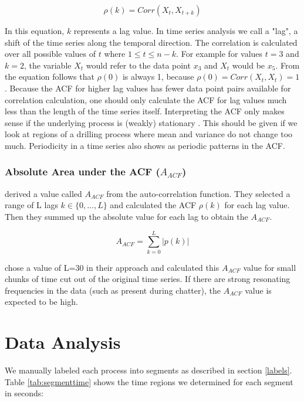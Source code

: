 \documentclass[12 pt]{scrartcl}
\begin{document}
\[ \rho(k) = Corr(X_t, X_{t+k}) \]

In this equation, $k$ represents a lag value. In time series analysis we call a "lag", a shift of the time series along the temporal direction. The correlation is calculated over all possible values of $t$ where $1 \le t \le n - k$. For example for values $t = 3$ and $k = 2$, the variable $X_t$ would refer to the data point $x_3$ and $X_t$ would be $x_5$. From the equation follows that $\rho(0)$ is always 1, because $\rho(0) = Corr(X_t, X_t) = 1$. Because the ACF for higher lag values has fewer data point pairs available for correlation calculation, one should only calculate the ACF for lag values much less than the length of the time series itself.
Interpreting the ACF only makes sense if the underlying process is (weakly) stationary \citep[p.~4]{deistler2022time}. This should be given if we look at regions of a drilling process where mean and variance do not change too much. Periodicity in a time series also shows as periodic patterns in the ACF.

\subsubsection{Absolute Area under the ACF ($A_{ACF}$)}

\citet{weinert2001statistics} derived a value called $A_{ACF}$ from the auto-correlation function. They selected a range of L lags $k \in \{0, ..., L\}$ and calculated the ACF $\rho(k)$ for each lag value. Then they summed up the absolute value for each lag to obtain the $A_{ACF}$.

\[ A_{ACF} = \sum^{L}_{k=0}{|p(k)|} \]

\citet{weinert2001statistics} chose a value of L=30 in their approach and calculated this $A_{ACF}$ value for small chunks of time cut out of the original time series. If there are strong resonating frequencies in the data (such as present during chatter), the $A_{ACF}$ value is expected to be high.

\section{Data Analysis}

We manually labeled each process into segments as described in section \ref{labels}. Table \ref{tab:segmenttime} shows the time regions we determined for each segment in seconds:
\end{document}
